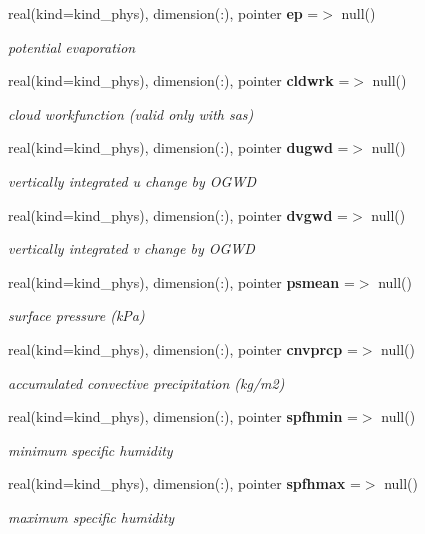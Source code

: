 \begin{DoxyCompactItemize}
real(kind=kind\+\_\+phys), dimension(\+:), pointer \textbf{ ep} =$>$ null()
\begin{DoxyCompactList}\small\item\em potential evaporation \end{DoxyCompactList}\item 
real(kind=kind\+\_\+phys), dimension(\+:), pointer \textbf{ cldwrk} =$>$ null()
\begin{DoxyCompactList}\small\item\em cloud workfunction (valid only with sas) \end{DoxyCompactList}\item 
real(kind=kind\+\_\+phys), dimension(\+:), pointer \textbf{ dugwd} =$>$ null()
\begin{DoxyCompactList}\small\item\em vertically integrated u change by O\+G\+WD \end{DoxyCompactList}\item 
real(kind=kind\+\_\+phys), dimension(\+:), pointer \textbf{ dvgwd} =$>$ null()
\begin{DoxyCompactList}\small\item\em vertically integrated v change by O\+G\+WD \end{DoxyCompactList}\item 
real(kind=kind\+\_\+phys), dimension(\+:), pointer \textbf{ psmean} =$>$ null()
\begin{DoxyCompactList}\small\item\em surface pressure (k\+Pa) \end{DoxyCompactList}\item 
real(kind=kind\+\_\+phys), dimension(\+:), pointer \textbf{ cnvprcp} =$>$ null()
\begin{DoxyCompactList}\small\item\em accumulated convective precipitation (kg/m2) \end{DoxyCompactList}\item 
real(kind=kind\+\_\+phys), dimension(\+:), pointer \textbf{ spfhmin} =$>$ null()
\begin{DoxyCompactList}\small\item\em minimum specific humidity \end{DoxyCompactList}\item 
real(kind=kind\+\_\+phys), dimension(\+:), pointer \textbf{ spfhmax} =$>$ null()
\begin{DoxyCompactList}\small\item\em maximum specific humidity \end{DoxyCompactList}\item 

\end{DoxyCompactItemize}
